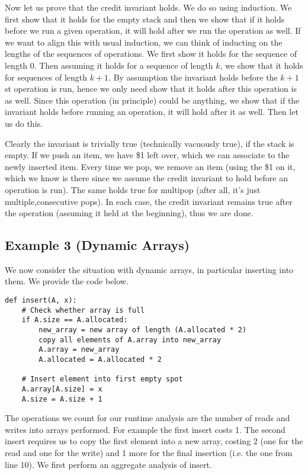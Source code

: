 Now let us prove that the credit invariant holds. We do so using induction. We first show that it holds for the empty stack and then we show that if it holds before we run a given operation, it will hold after we run the operation as well. If we want to align this with usual induction, we can think of inducting on the lengths of the sequences of operations. We first show it holds for the sequence of length 0. Then assuming it holds for a sequence of length $k$, we show that it holds for sequences of length $k + 1$. By assumption the invariant holds before the $k + 1$st operation is run, hence we only need show that it holds after this operation is as well. Since this operation (in principle) could be anything, we show that if the invariant holds before running an operation, it will hold after it as well. Then let us do this.

Clearly the invariant is trivially true (technically vacuously true), if the stack is empty. If we push an item, we have \$1 left over, which we can associate to the newly inserted item. Every time we pop, we remove an item (using the \$1 on it, which we know is there since we assume the credit invariant to hold before an operation is run). The same holds true for multipop (after all, it's just multiple,consecutive pops). In each case, the credit invariant remains true after the operation (assuming it held at the beginning), thus we are done.

\subsection{Example 3 (Dynamic Arrays)}
We now consider the situation with dynamic arrays, in particular inserting into them. We provide the code below.
\begin{lstlisting}
def insert(A, x):
    # Check whether array is full
    if A.size == A.allocated:
        new_array = new array of length (A.allocated * 2)
        copy all elements of A.array into new_array
        A.array = new_array
        A.allocated = A.allocated * 2
        
    # Insert element into first empty spot
    A.array[A.size] = x
    A.size = A.size + 1
\end{lstlisting}
The operations we count for our runtime analysis are the number of reads and writes into arrays performed. For example the first insert costs 1. The second insert requires us to copy the first element into a new array, costing 2 (one for the read and one for the write) and 1 more for the final insertion (i.e. the one from line 10). We first perform an aggregate analysis of insert.

